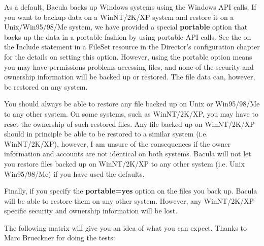 As a default, Bacula backs up Windows systems using the Windows API calls.
If you want to backup data on a WinNT/2K/XP system and restore it on a
Unix/Win95/98/Me system, we have provided a special {\bf portable} option
that backs up the data in a portable fashion by using portable API calls.
See the  on the Include statement in a
FileSet resource in the Director's configuration chapter for the details on
setting this option.  However, using the portable option means you may have
permissions problems accessing files, and none of the security and
ownership information will be backed up or restored.  The file data can,
however, be restored on any system.

You should always be able to restore any file backed up on Unix or Win95/98/Me
to any other system. On some systems, such as WinNT/2K/XP, you may have to
reset the ownership of such restored files. Any file backed up on WinNT/2K/XP
should in principle be able to be restored to a similar system (i.e.
WinNT/2K/XP), however, I am unsure of the consequences if the owner
information and accounts are not identical on both systems. Bacula will not
let you restore files backed up on WinNT/2K/XP to any other system (i.e. Unix
Win95/98/Me) if you have used the defaults. 

Finally, if you specify the {\bf portable=yes} option on the files you back
up. Bacula will be able to restore them on any other system. However, any
WinNT/2K/XP specific security and ownership information will be lost. 

The following matrix will give you an idea of what you can expect. Thanks to
Marc Brueckner for doing the tests: 

